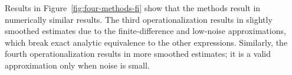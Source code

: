 Results in Figure~\ref{fig:four-methods-fi} show that the methods result in numerically similar results.
The third operationalization results in slightly smoothed estimates due to the finite-difference and low-noise approximations, which break exact analytic equivalence to the other expressions.
Similarly, the fourth operationalization results in more smoothed estimates; it is a valid approximation only when noise is small.
